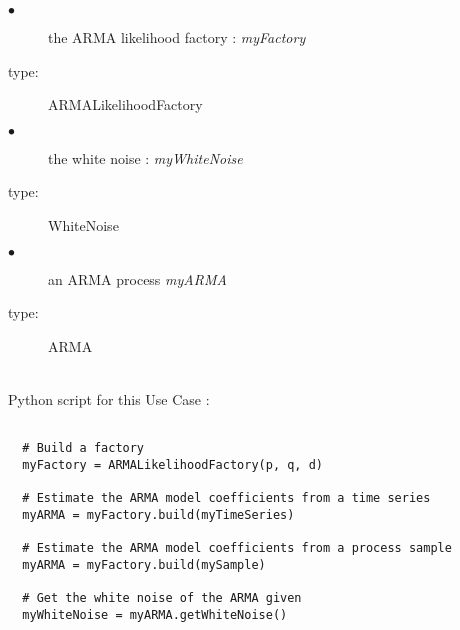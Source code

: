 {
  \begin{description}
  \item[$\bullet$] the ARMA likelihood factory : {\itshape myFactory}
  \item[type:]  ARMALikelihoodFactory
  \end{description}

  \begin{description}
  \item[$\bullet$] the white noise : {\itshape myWhiteNoise}
  \item[type:]  WhiteNoise
  \end{description}

  \begin{description}
  \item[$\bullet$] an ARMA process {\itshape myARMA}
  \item[type:]  ARMA
  \end{description}

}

\textspace\\
Python script for this Use Case :
\begin{lstlisting}

  # Build a factory
  myFactory = ARMALikelihoodFactory(p, q, d)

  # Estimate the ARMA model coefficients from a time series
  myARMA = myFactory.build(myTimeSeries)

  # Estimate the ARMA model coefficients from a process sample
  myARMA = myFactory.build(mySample)

  # Get the white noise of the ARMA given
  myWhiteNoise = myARMA.getWhiteNoise()
\end{lstlisting}
